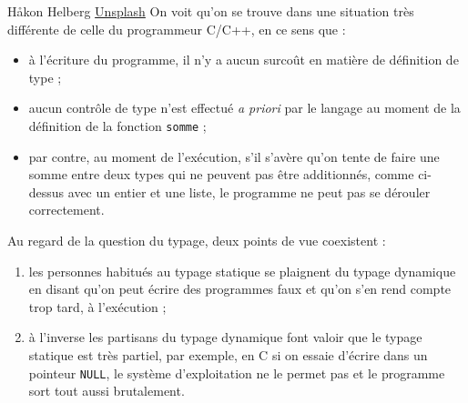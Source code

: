 %
%
{Håkon Helberg \href{https://unsplash.com/@hakonbrakon?utm_source=unsplash&utm_medium=referral&utm_content=creditCopyText}{Unsplash}}%
On voit qu'on se trouve dans une situation très différente de celle du programmeur C/C++, en ce sens que :
\begin{itemize}
	\item à l'écriture du programme, il n'y a aucun surcoût en matière de définition de type ;
	\item aucun contrôle de type n'est effectué \textit{a priori} par le langage au moment de la définition de la fonction \texttt{somme} ;
	\item par contre, au moment de l'exécution, s'il s'avère qu'on tente de faire une somme entre deux types qui ne peuvent pas être additionnés, comme ci-dessus avec un entier et une liste, le programme ne peut pas se dérouler correctement.
\end{itemize}

Au regard de la question du typage, deux points de vue coexistent :
\begin{enumerate}
	\item  les personnes habitués au typage statique se plaignent du typage dynamique en disant qu'on peut écrire des programmes faux et qu'on s'en rend compte trop tard, à l'exécution ;
	\item à l'inverse les partisans du typage dynamique font valoir que le typage statique est très partiel, par exemple, en C si on essaie d'écrire dans un pointeur \texttt{NULL}, le système d'exploitation ne le permet pas et le programme sort tout aussi brutalement.
\end{enumerate}

